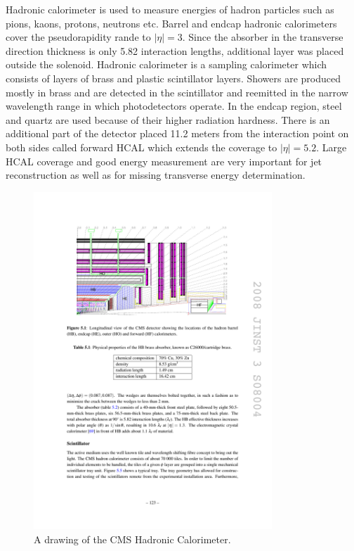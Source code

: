 Hadronic calorimeter is used to measure energies of hadron particles such as pions, kaons, protons, neutrons etc. Barrel and endcap hadronic calorimeters cover the pseudorapidity rande to $|\eta|=3$. 
Since the absorber in the transverse direction thickness is only 5.82 interaction lengths, additional layer was placed outside the solenoid.  Hadronic calorimeter is a sampling calorimeter which consists of layers of brass and plastic scintillator layers. Showers are produced mostly in brass and are detected in the scintillator and reemitted in the narrow wavelength range in which photodetectors operate. In the endcap region, steel and quartz are used because of their higher radiation hardness. There is an additional part of the detector placed 11.2 meters from the interaction point on both sides called forward HCAL which extends the coverage to $|\eta|=5.2$. Large HCAL coverage and good energy measurement are very important for jet reconstruction as well as for missing transverse energy determination.  
\begin{figure}[htbp]
	\centering
		\includegraphics[width=0.8\textwidth]{Figures/HCAL.pdf}
	\caption[CMS Hadronic Calorimeter]{A drawing of the CMS Hadronic Calorimeter. \cite{Chatrchyan:2008aa}}
	\label{fig:HCAL}
\end{figure}


